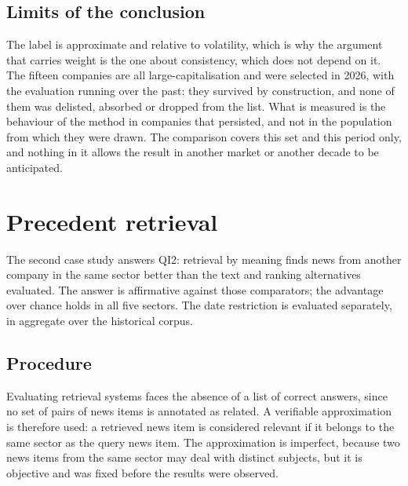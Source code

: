 \subsection{Limits of the conclusion}

The label is approximate and relative to volatility, which is why the argument that carries weight
is the one about consistency, which does not depend on it. The fifteen companies are all
large-capitalisation and were selected in 2026, with the evaluation running over the past: they
survived by construction, and none of them was delisted, absorbed or dropped from the list. What is
measured is the behaviour of the method in companies that persisted, and not in the population from
which they were drawn. The comparison covers
this set and this period only, and nothing in it allows the result in another market or another
decade to be anticipated.

\section{Precedent retrieval}
\label{sec:av_qi2}

The second case study answers \gls{QI}2: retrieval by meaning finds news from another company
in the same sector better than the text and ranking alternatives evaluated. The answer is
affirmative against those comparators; the advantage over chance holds in all five sectors.
The date restriction is evaluated separately, in aggregate over the historical corpus.

\subsection{Procedure}

Evaluating retrieval systems faces the absence of a list of correct answers, since no set of pairs
of news items is annotated as related. A verifiable approximation is therefore used: a retrieved
news item is considered relevant if it belongs to the same sector as the query news item. The
approximation is imperfect, because two news items from the same sector may deal with distinct
subjects, but it is objective and was fixed before the results were observed.

